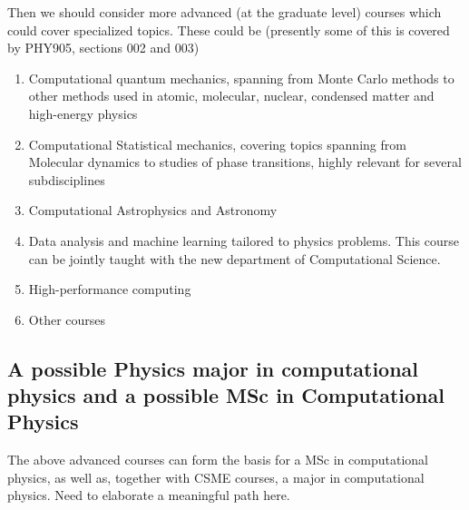 \documentclass[%
oneside,                 %
final,                   %
10pt]{article}
\begin{document}
\noindent
Then we should consider more advanced (at the graduate level) courses which could cover specialized topics.
These could be (presently some of this is covered by PHY905, sections 002 and 003)
\begin{enumerate}
  \item Computational quantum mechanics, spanning from Monte Carlo methods to other methods used in atomic, molecular, nuclear, condensed matter and high-energy physics

  \item Computational Statistical mechanics, covering topics spanning from Molecular dynamics to studies of phase transitions, highly relevant for several subdisciplines

  \item Computational Astrophysics and Astronomy

  \item Data analysis and machine learning tailored to physics problems. This course can be jointly taught with the new department of Computational Science.

  \item High-performance computing

  \item Other courses
\end{enumerate}

\noindent
\subsection{A possible Physics major in computational physics and a possible MSc in Computational Physics}

The above advanced courses can form the basis for a MSc in computational physics, as well as, together with 
CSME courses, a major in computational physics. Need to elaborate a meaningful path here. 


% 
% 



\end{document}
